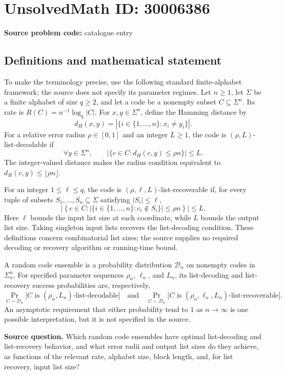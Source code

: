 \documentclass[11pt]{article}
\begin{document}
\section*{UnsolvedMath ID: 30006386}
\textbf{Source problem code:} catalogue entry
\subsection{Definitions and mathematical statement}
To make the terminology precise, use the following standard finite-alphabet framework; the source does not specify its parameter regimes. Let \(n\geq 1\), let \(\Sigma\) be a finite alphabet of size \(q\geq 2\), and let a code be a nonempty subset \(C\subseteq\Sigma^n\). Its rate is \(R(C)=n^{-1}\log_q|C|\). For \(x,y\in\Sigma^n\), define the Hamming distance by
\[
 d_H(x,y)=|\{i\in\{1,\ldots,n\}:x_i\ne y_i\}|.
\]
For a relative error radius \(\rho\in[0,1]\) and an integer \(L\geq 1\), the code is \((\rho,L)\)-list-decodable if
\[
 \forall y\in\Sigma^n,\qquad
 |\{c\in C:d_H(c,y)\leq\rho n\}|\leq L.
\]
The integer-valued distance makes the radius condition equivalent to \(d_H(c,y)\leq\lfloor\rho n\rfloor\).

For an integer \(1\leq\ell\leq q\), the code is \((\rho,\ell,L)\)-list-recoverable if, for every tuple of subsets \(S_1,\ldots,S_n\subseteq\Sigma\) satisfying \(|S_i|\leq\ell\),
\[
 \left|\left\{c\in C:
 |\{i\in\{1,\ldots,n\}:c_i\notin S_i\}|\leq\rho n
 \right\}\right|\leq L.
\]
Here \(\ell\) bounds the input list size at each coordinate, while \(L\) bounds the output list size. Taking singleton input lists recovers the list-decoding condition. These definitions concern combinatorial list sizes; the source supplies no required decoding or recovery algorithm or running-time bound.

A random code ensemble is a probability distribution \(\mathcal D_n\) on nonempty codes in \(\Sigma_n^n\). For specified parameter sequences \(\rho_n\), \(\ell_n\), and \(L_n\), its list-decoding and list-recovery success probabilities are, respectively,
\[
 \Pr_{C\sim\mathcal D_n}\bigl[C\text{ is }(\rho_n,L_n)\text{-list-decodable}\bigr]
 \quad\text{and}\quad
 \Pr_{C\sim\mathcal D_n}\bigl[C\text{ is }(\rho_n,\ell_n,L_n)\text{-list-recoverable}\bigr].
\]
An asymptotic requirement that either probability tend to \(1\) as \(n\to\infty\) is one possible interpretation, but it is not specified in the source.

\textbf{Source question.} Which random code ensembles have optimal list-decoding and list-recovery behavior, and what error radii and output list sizes do they achieve, as functions of the relevant rate, alphabet size, block length, and, for list recovery, input list size?
\end{document}
